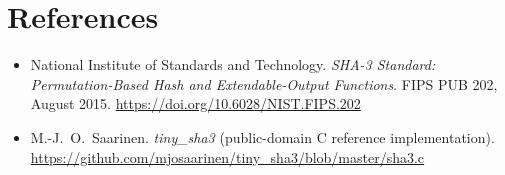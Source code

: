 \documentclass[11pt]{article}
\begin{document}
\section{References}

\begin{itemize}[noitemsep]
  \item National Institute of Standards and Technology.
        \textit{SHA-3 Standard: Permutation-Based Hash and Extendable-Output
        Functions}. FIPS PUB 202, August 2015.
        \url{https://doi.org/10.6028/NIST.FIPS.202}
  \item M.-J.\ O.\ Saarinen. \textit{tiny\_sha3} (public-domain C reference
        implementation). \url{https://github.com/mjosaarinen/tiny_sha3/blob/master/sha3.c}
\end{itemize}
\end{document}
